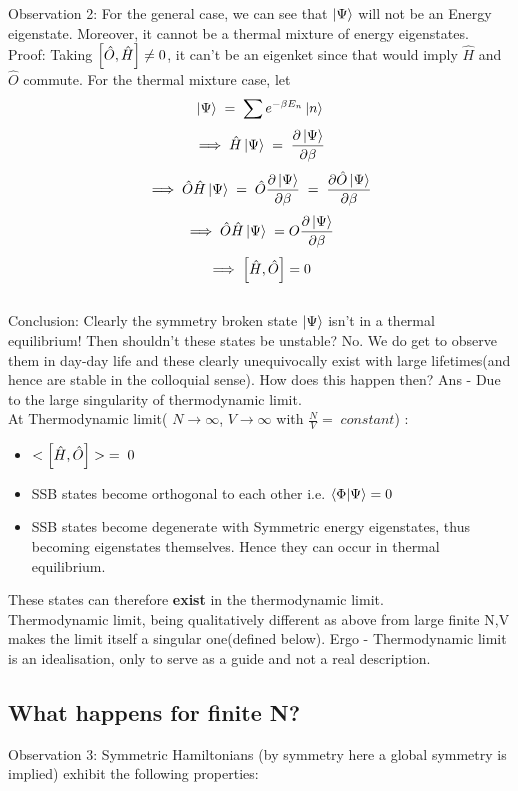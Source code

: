 \documentclass[12pt]{article}
\begin{document}
Observation 2: For the general case, we can see that $\ket{\Psi}$ will not be an Energy eigenstate. Moreover, it cannot be a thermal mixture of energy eigenstates.\\
Proof: Taking $\comm{\hat{O}}{\hat{H}}\neq 0$, it can't be an eigenket since that would imply $\hat{H}$ and $\hat{O}$ commute.
For the thermal mixture case, let
$$\ket{\Psi}\;=\;\sum e^{-\beta E_n }\ket{n}$$
$$\implies \hat{H}\ket{\Psi}\;=\;\pdv{\ket{\Psi}}{\beta}$$
$$\implies \hat{O}\hat{H}\ket{\Psi}\;=\; \hat{O}\pdv{\ket{\Psi}}{\beta}\;=\;\pdv{\hat{O}\ket{\Psi}}{\beta}$$
$$\implies \hat{O}\hat{H}\ket{\Psi}\;= O \pdv{\ket{\Psi}}{\beta} $$
$$\implies \comm{\hat{H}}{\hat{O}}=0$$
\\
Conclusion: Clearly the symmetry broken state $\ket{\Psi}$ isn't in a thermal equilibrium! Then shouldn't these states be unstable?
No. We do get to observe them in day-day life and these clearly unequivocally exist with large lifetimes(and hence are stable in the colloquial sense).
How does this happen then? Ans - Due to the large singularity of thermodynamic limit. \\
At Thermodynamic limit( $N\rightarrow \infty$, $V\rightarrow \infty$ with $\displaystyle{\frac{N}{V}=\; constant}$) :
\begin{itemize}
    \item  $<\comm{\hat{H}}{\hat{O}}>\;=\;0$
    \item SSB states become orthogonal to each other i.e. $\braket{\Phi}{\Psi}=0$
    \item SSB states become degenerate with Symmetric energy eigenstates, thus becoming eigenstates themselves. Hence they can occur in thermal equilibrium.
\end{itemize}
These states can therefore \textbf{exist} in the thermodynamic limit.\\
Thermodynamic limit, being qualitatively different as above from large finite N,V makes the limit itself a singular one(defined below). Ergo - Thermodynamic limit is an idealisation, only to serve as a guide and not a real description.
\subsection{What happens for finite N?}
Observation 3: Symmetric Hamiltonians (by symmetry here a global symmetry is implied) exhibit the following properties:
\end{document}
